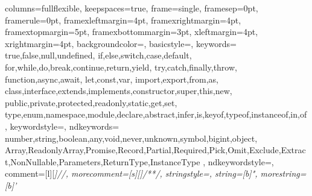 {
    columns=fullflexible,
    keepspaces=true,
    frame=single,
    framesep=0pt,
    framerule=0pt,
    framexleftmargin=4pt,
    framexrightmargin=4pt,
    framextopmargin=5pt,
    framexbottommargin=3pt,
    xleftmargin=4pt,
    xrightmargin=4pt,
    backgroundcolor=\color{GrayCodeBlock},
    basicstyle=\ttfamily\color{BlackText},
    keywords={
        true,false,null,undefined,
        if,else,switch,case,default,
        for,while,do,break,continue,return,yield,
        try,catch,finally,throw,
        function,async,await,
        let,const,var,
        import,export,from,as,
        class,interface,extends,implements,constructor,super,this,new,
        public,private,protected,readonly,static,get,set,
        type,enum,namespace,module,declare,abstract,infer,is,keyof,typeof,instanceof,in,of
    },
    keywordstyle=\color{PurpleKeyword},
    ndkeywords={
        number,string,boolean,any,void,never,unknown,symbol,bigint,object,
        Array,ReadonlyArray,Promise,Record,Partial,Required,Pick,Omit,Exclude,Extract,NonNullable,Parameters,ReturnType,InstanceType
    },
    ndkeywordstyle=\color{RedTypename},
    comment=[l][\color{GrayComment}\slshape]{//},
    morecomment=[s][\color{GrayComment}\slshape]{/*}{*/},
    stringstyle=\color{GreenString},
    string=[b]",
    morestring=[b]'
}
